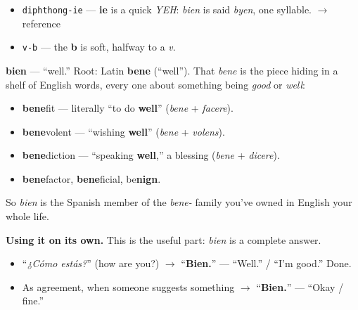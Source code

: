 \begin{sounds}
\begin{itemize}
\raggedright
  \item \texttt{diphthong-ie} — \textbf{ie} is a quick \emph{YEH}: \emph{bien} is said \emph{byen}, one syllable. $\to$ reference
  \item \texttt{v-b} — the \textbf{b} is soft, halfway to a \emph{v}.
\end{itemize}
\end{sounds}

\begin{cousinweb}
\textbf{bien} — \textquotedblleft{}well.\textquotedblright{} Root: Latin \textbf{bene} (\textquotedblleft{}well\textquotedblright{}). That \emph{bene} is the piece hiding in a shelf of English words, every one about something being \emph{good} or \emph{well}:

\begin{itemize}
\raggedright
  \item \textbf{bene}fit — literally \textquotedblleft{}to do \textbf{well}\textquotedblright{} (\emph{bene} + \emph{facere}).
  \item \textbf{bene}volent — \textquotedblleft{}wishing \textbf{well}\textquotedblright{} (\emph{bene} + \emph{volens}).
  \item \textbf{bene}diction — \textquotedblleft{}speaking \textbf{well},\textquotedblright{} a blessing (\emph{bene} + \emph{dicere}).
  \item \textbf{bene}factor, \textbf{bene}ficial, be\textbf{nign}.
\end{itemize}

So \emph{bien} is the Spanish member of the \emph{bene-} family you've owned in English your whole life.

\textbf{Using it on its own.} This is the useful part: \emph{bien} is a complete answer.

\begin{itemize}
\raggedright
  \item \textquotedblleft{}\emph{¿Cómo estás?}\textquotedblright{} (how are you?) $\to$ \textquotedblleft{}\textbf{Bien.}\textquotedblright{} — \textquotedblleft{}Well.\textquotedblright{} / \textquotedblleft{}I'm good.\textquotedblright{} Done.
  \item As agreement, when someone suggests something $\to$ \textquotedblleft{}\textbf{Bien.}\textquotedblright{} — \textquotedblleft{}Okay / fine.\textquotedblright{}
\end{itemize}
\end{cousinweb}


